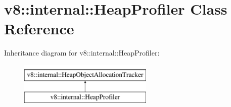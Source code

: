 \hypertarget{classv8_1_1internal_1_1HeapProfiler}{}\section{v8\+:\+:internal\+:\+:Heap\+Profiler Class Reference}
\label{classv8_1_1internal_1_1HeapProfiler}
Inheritance diagram for v8\+:\+:internal\+:\+:Heap\+Profiler\+:\begin{figure}[H]
\begin{center}
\leavevmode
\includegraphics[height=2.000000cm]{classv8_1_1internal_1_1HeapProfiler}
\end{center}
\end{figure}
